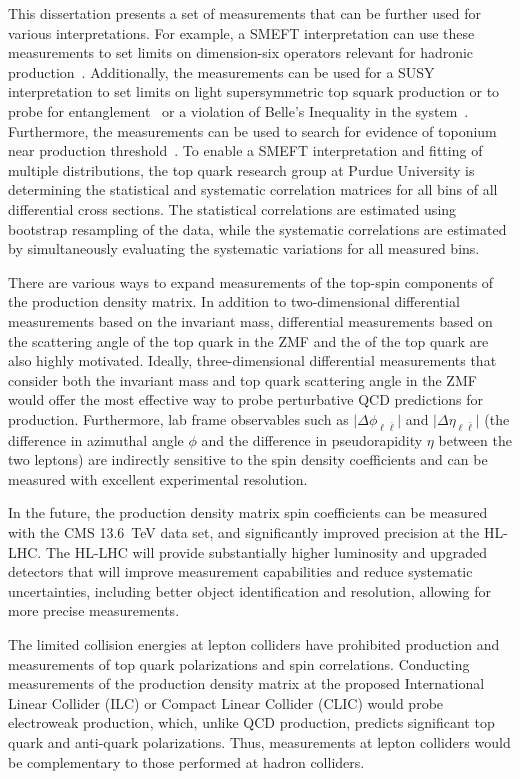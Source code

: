 This dissertation presents a set of measurements that can be further used for various interpretations. 
For example, a SMEFT interpretation can use these measurements to set limits on dimension-six operators relevant for hadronic \ttbar production~\cite{Sirunyan:2681777}. 
Additionally, the measurements can be used for a SUSY interpretation to set limits on light supersymmetric top squark production or to probe for entanglement~\cite{Afik_2021} or a violation of Belle's Inequality in the \ttbar system~\cite{Aguilar_Saavedra_2022}. 
Furthermore, the measurements can be used to search for evidence of toponium near \ttbar production threshold~\cite{PhysRevD.104.034023}. 
To enable a SMEFT interpretation and fitting of multiple distributions, the top quark research group at Purdue University is determining the statistical and systematic correlation matrices for all bins of all differential cross sections. 
The statistical correlations are estimated using bootstrap resampling of the data, while the systematic correlations are estimated by simultaneously evaluating the systematic variations for all measured bins.

There are various ways to expand measurements of the top-spin components of the \ttbar production density matrix. 
In addition to two-dimensional differential measurements based on the \ttbar invariant mass, differential measurements based on the scattering angle of the top quark in the \ttbar ZMF and the \pT of the top quark are also highly motivated. 
Ideally, three-dimensional differential measurements that consider both the \ttbar invariant mass and top quark scattering angle in the \ttbar ZMF would offer the most effective way to probe perturbative QCD predictions for \ttbar production.
Furthermore, lab frame observables such as $\vert \Delta\phi_{\ell\bar{\ell}} \vert$ and $\vert \Delta\eta_{\ell\bar{\ell}} \vert$ (the difference in azimuthal angle $\phi$ and the difference in pseudorapidity $\eta$ between the two leptons) are indirectly sensitive to the spin density coefficients and can be measured with excellent experimental resolution.

In the future, the \ttbar production density matrix spin coefficients can be measured with the CMS \SI{13.6}{\TeV} data set, and significantly improved precision at the HL-LHC.
The HL-LHC will provide substantially higher luminosity and upgraded detectors that will improve measurement capabilities and reduce systematic uncertainties, including better object identification and resolution, allowing for more precise measurements.

The limited collision energies at lepton colliders have prohibited \ttbar production and measurements of top quark polarizations and \ttbar spin correlations. 
Conducting measurements of the \ttbar production density matrix at the proposed International Linear Collider (ILC) or Compact Linear Collider (CLIC) would probe electroweak \ttbar production, which, unlike QCD production, predicts significant top quark and anti-quark polarizations. 
Thus, measurements at lepton colliders would be complementary to those performed at hadron colliders.

